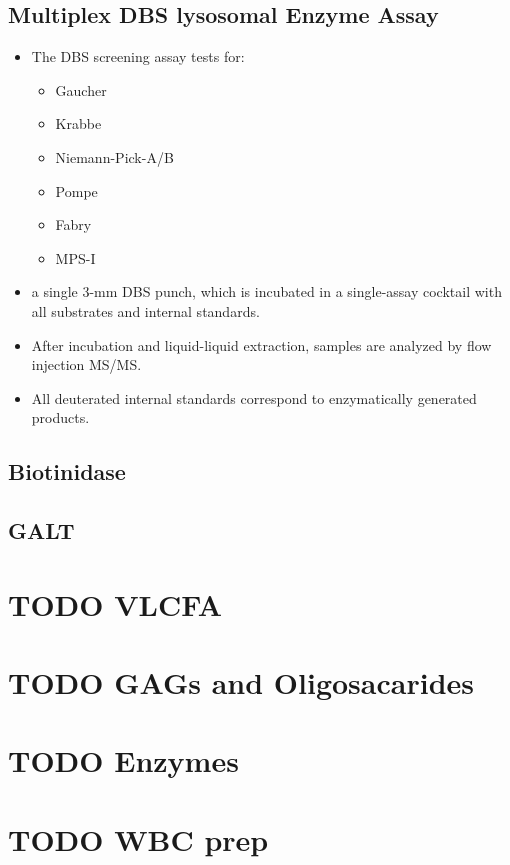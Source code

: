 \documentclass{scrartcl}
\begin{document}
\subsection{Multiplex DBS lysosomal Enzyme Assay}
\label{sec:org070cf19}
\begin{itemize}
\item The DBS screening assay tests for:
\begin{itemize}
\item Gaucher
\item Krabbe
\item Niemann-Pick-A/B
\item Pompe
\item Fabry
\item MPS-I
\end{itemize}
\item a single 3-mm DBS punch, which is incubated in a single-assay
cocktail with all substrates and internal standards.
\item After incubation and liquid-liquid extraction, samples are analyzed by flow injection MS/MS.
\item All deuterated internal standards correspond to enzymatically generated products.
\end{itemize}
\subsection{Biotinidase}
\label{sec:orgac4fd69}
\subsection{GALT}
\label{sec:orgc461985}

\section{{\bfseries\sffamily TODO} VLCFA}
\label{sec:org2291653}
\section{{\bfseries\sffamily TODO} GAGs and Oligosacarides}
\label{sec:org9dc78fc}
\section{{\bfseries\sffamily TODO} Enzymes}
\label{sec:org6cb2ed1}
\section{{\bfseries\sffamily TODO} WBC prep}
\label{sec:org4ba5d3d}
\end{document}
